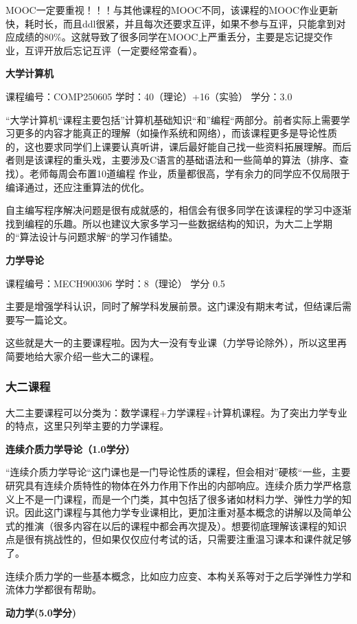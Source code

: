 \documentclass[
decoration,  %
]{qyxf-book}
\begin{document}
MOOC一定要重视！！！与其他课程的MOOC不同，该课程的MOOC作业更新快，耗时长，而且ddl很紧，并且每次还要求互评，如果不参与互评，只能拿到对应成绩的80\%。这就导致了很多同学在MOOC上严重丢分，主要是忘记提交作业，互评开放后忘记互评（一定要经常查看）。


\textbf{大学计算机}


课程编号：COMP250605 学时：40（理论）+16（实验） 学分：3.0

“大学计算机“课程主要包括”计算机基础知识“和”编程“两部分。前者实际上需要学习更多的内容才能真正的理解（如操作系统和网络），而该课程更多是导论性质的，这也要求同学们上课要认真听讲，课后最好能自己找一些资料拓展理解。而后者则是该课程的重头戏，主要涉及C语言的基础语法和一些简单的算法（排序、查找）。老师每周会布置10道编程 作业，质量都很高，学有余力的同学应不仅局限于编译通过，还应注重算法的优化。

自主编写程序解决问题是很有成就感的，相信会有很多同学在该课程的学习中逐渐找到编程的乐趣。所以也建议大家多学习一些数据结构的知识，为大二上学期的“算法设计与问题求解“的学习作铺垫。


\textbf{力学导论}


课程编号：MECH900306 学时：8（理论） 学分 0.5


主要是增强学科认识，同时了解学科发展前景。这门课没有期末考试，但结课后需要写一篇论文。

这些就是大一的主要课程啦。因为大一没有专业课（力学导论除外），所以这里再简要地给大家介绍一些大二的课程。

\subsubsection{大二课程}

大二主要课程可以分类为：数学课程+力学课程+计算机课程。为了突出力学专业的特点，这里只列举主要的力学课程。

\textbf{连续介质力学导论（1.0学分）}
	
“连续介质力学导论“这门课也是一门导论性质的课程，但会相对”硬核“一些，主要研究具有连续介质特性的物体在外力作用下作出的内部响应。连续介质力学严格意义上不是一门课程，而是一个门类，其中包括了很多诸如材料力学、弹性力学的知识。因此这门课程与其他力学专业课相比，更加注重对基本概念的讲解以及简单公式的推演（很多内容在以后的课程中都会再次提及）。想要彻底理解该课程的知识点是很有挑战性的，但如果仅仅应付考试的话，只需要注重温习课本和课件就足够了。
	
连续介质力学的一些基本概念，比如应力应变、本构关系等对于之后学弹性力学和流体力学都很有帮助。

\textbf{动力学(5.0学分)}
	
\end{document}
